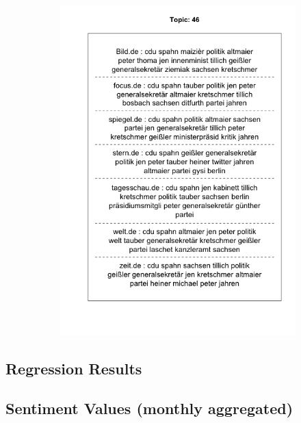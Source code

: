 \documentclass[12pt,a4paper,notitlepage]{article}
\begin{document}
\begin{figure}[H]
\begin{center}
\begin{subfigure}[normla]{0.49\textwidth}
			\includegraphics[width=\textwidth]{figs/plotquote46.png}
		\end{subfigure}
	\end{center}
\end{figure}

\subsection{Regression Results}\label{apx_coeff}
\begin{minipage}[t]{0.49\textwidth}
	
\end{minipage}
\begin{minipage}[t]{0.49\textwidth}
	
\end{minipage}

\subsection{Sentiment Values (monthly aggregated)}\label{apx_sentscore_monthly}
\end{document}
